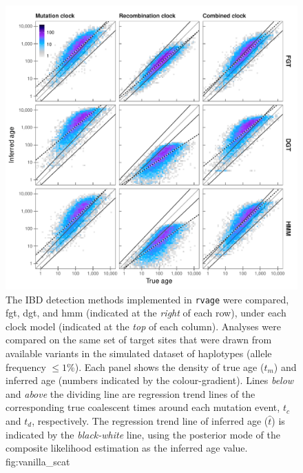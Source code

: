 

\begin{figure}[p]
\includegraphics[width=\textwidth]{./img/ch5/vanilla_scat}
{The  IBD detection methods implemented in \texttt{rvage} were compared, \ie \gls{fgt}, \gls{dgt}, and \gls{hmm} (indicated at the \emph{right} of each row), under each clock model (indicated at the \emph{top} of each column).
Analyses were compared on the same set of  target sites that were drawn from available \fk{[2,20]} variants in the simulated dataset of  haplotypes (allele frequency ${\leq 1\%}$).
Each panel shows the density of true age ($t_m$) and inferred age (numbers indicated by the colour-gradient).
Lines \emph{below} and \emph{above} the dividing line are regression trend lines of the corresponding true coalescent times around each mutation event, $t_c$ and $t_d$, respectively.
The regression trend line of inferred age ($\hat{t}$) is indicated by the \emph{black-white} line, using the posterior mode of the composite likelihood estimation as the inferred age value.}
{fig:vanilla_scat}
\end{figure}
